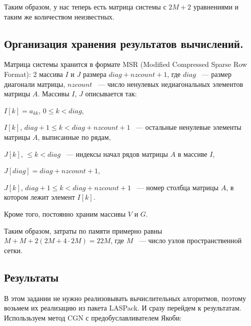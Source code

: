 \documentclass[12pt]{article}
\begin{document}
Таким образом, у нас теперь есть матрица системы с $2M + 2$ уравнениями и таким же количеством неизвестных.

\subsection{Организация хранения результатов вычислений.}

Матрица системы хранится в формате MSR (Modified Compressed Sparse Row Format): 2 массива $I$ и $J$ размера $diag + nzcount + 1$, где $diag$ ~--- размер диагонали матрицы, $nzcount$ ~--- число ненулевых недиагональных элементов матрицы $A$. Массивы $I$, $J$ описывается так:

$I\left[k\right] = a_{kk}$,  $0 \leq k < diag$,

$I\left[k\right]$,  $diag + 1 \leq k < diag + nzcount + 1$ ~--- остальные ненулевые элементы матрицы $A$, выписанные по рядам,

$J\left[k\right]$,  $\leq k < diag$ ~--- индексы начал рядов матрицы $A$ в массиве $I$,

$J[diag] = diag + nzcount + 1$,

$J\left[k\right]$,  $diag + 1 \leq k < diag + nzcount + 1$ ~--- номер столбца матрицы $A$, в котором лежит элемент $I[k]$.

Кроме того, постоянно храним массивы $V$ и $G$.

Таким образом, затраты по памяти примерно равны $M + M + 2(2M + 4\cdot 2M) = 22M$, где $M$ ~--- число узлов пространственной сетки.

\subsection{Результаты}

В этом задании не нужно реализовывать вычислительных алгоритмов, поэтому возьмем их реализацию из пакета LASPack. И сразу перейдем к результатам.
\\

Использьзуем метод CGN с предобуславливателем Якоби:
\end{document}
